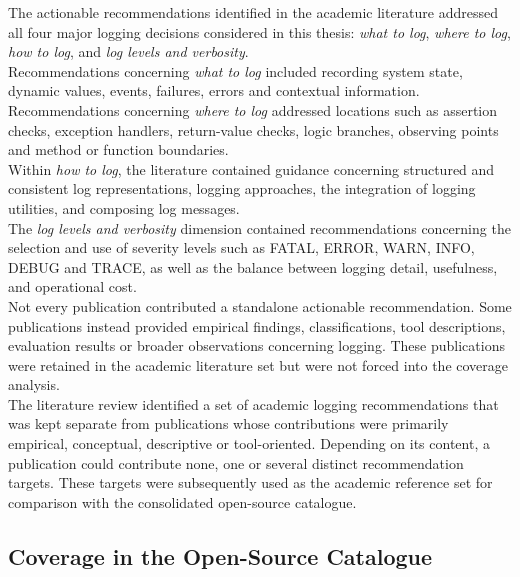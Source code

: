 The actionable recommendations identified in the academic literature addressed all
four major logging decisions considered in this thesis: \textit{what to log},
\textit{where to log}, \textit{how to log}, and
\textit{log levels and verbosity}.
\\
Recommendations concerning \textit{what to log} included recording system state,
dynamic values, events, failures, errors and contextual information.
\\
Recommendations concerning \textit{where to log} addressed locations such as
assertion checks, exception handlers, return-value checks, logic branches, observing points and
method or function boundaries.
\\
Within \textit{how to log}, the literature contained guidance concerning structured
and consistent log representations, logging approaches, the integration of logging
utilities, and composing log messages.
\\
The \textit{log levels and verbosity} dimension contained recommendations concerning
the selection and use of severity levels such as FATAL, ERROR, WARN, INFO, DEBUG
and TRACE, as well as the balance between logging detail, usefulness, and operational
cost.
\\
Not every publication contributed a standalone actionable recommendation. Some
publications instead provided empirical findings, classifications, tool descriptions,
evaluation results or broader observations concerning logging. These publications
were retained in the academic literature set but were not forced into the coverage
analysis.
\\
The literature review identified a set of academic logging recommendations that was
kept separate from publications whose contributions were primarily empirical,
conceptual, descriptive or tool-oriented. Depending on its content, a publication
could contribute none, one or several distinct recommendation targets. These targets
were subsequently used as the academic reference set for comparison with the
consolidated open-source catalogue.


\subsection{Coverage in the Open-Source Catalogue}
\label{sec:results-cross-source}

